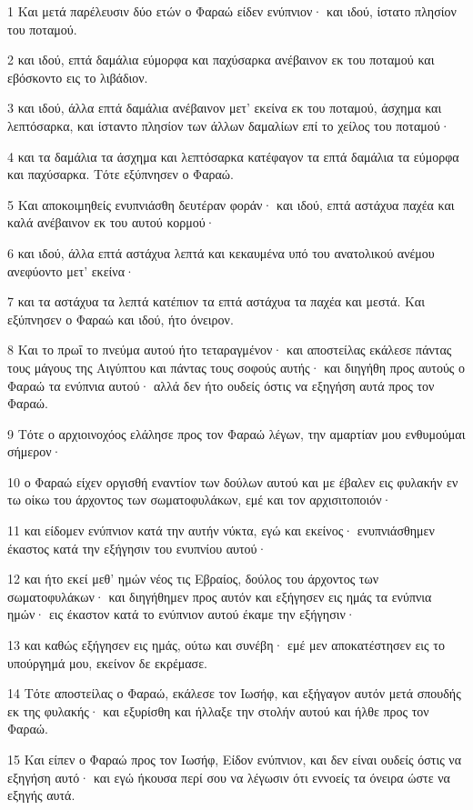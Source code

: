 \par 1 Και μετά παρέλευσιν δύο ετών ο Φαραώ είδεν ενύπνιον· και ιδού, ίστατο πλησίον του ποταμού.
\par 2 και ιδού, επτά δαμάλια εύμορφα και παχύσαρκα ανέβαινον εκ του ποταμού και εβόσκοντο εις το λιβάδιον.
\par 3 και ιδού, άλλα επτά δαμάλια ανέβαινον μετ' εκείνα εκ του ποταμού, άσχημα και λεπτόσαρκα, και ίσταντο πλησίον των άλλων δαμαλίων επί το χείλος του ποταμού·
\par 4 και τα δαμάλια τα άσχημα και λεπτόσαρκα κατέφαγον τα επτά δαμάλια τα εύμορφα και παχύσαρκα. Τότε εξύπνησεν ο Φαραώ.
\par 5 Και αποκοιμηθείς ενυπνιάσθη δευτέραν φοράν· και ιδού, επτά αστάχυα παχέα και καλά ανέβαινον εκ του αυτού κορμού·
\par 6 και ιδού, άλλα επτά αστάχυα λεπτά και κεκαυμένα υπό του ανατολικού ανέμου ανεφύοντο μετ' εκείνα·
\par 7 και τα αστάχυα τα λεπτά κατέπιον τα επτά αστάχυα τα παχέα και μεστά. Και εξύπνησεν ο Φαραώ και ιδού, ήτο όνειρον.
\par 8 Και το πρωΐ το πνεύμα αυτού ήτο τεταραγμένον· και αποστείλας εκάλεσε πάντας τους μάγους της Αιγύπτου και πάντας τους σοφούς αυτής· και διηγήθη προς αυτούς ο Φαραώ τα ενύπνια αυτού· αλλά δεν ήτο ουδείς όστις να εξηγήση αυτά προς τον Φαραώ.
\par 9 Τότε ο αρχιοινοχόος ελάλησε προς τον Φαραώ λέγων, την αμαρτίαν μου ενθυμούμαι σήμερον·
\par 10 ο Φαραώ είχεν οργισθή εναντίον των δούλων αυτού και με έβαλεν εις φυλακήν εν τω οίκω του άρχοντος των σωματοφυλάκων, εμέ και τον αρχισιτοποιόν·
\par 11 και είδομεν ενύπνιον κατά την αυτήν νύκτα, εγώ και εκείνος· ενυπνιάσθημεν έκαστος κατά την εξήγησιν του ενυπνίου αυτού·
\par 12 και ήτο εκεί μεθ' ημών νέος τις Εβραίος, δούλος του άρχοντος των σωματοφυλάκων· και διηγήθημεν προς αυτόν και εξήγησεν εις ημάς τα ενύπνια ημών· εις έκαστον κατά το ενύπνιον αυτού έκαμε την εξήγησιν·
\par 13 και καθώς εξήγησεν εις ημάς, ούτω και συνέβη· εμέ μεν αποκατέστησεν εις το υπούργημά μου, εκείνον δε εκρέμασε.
\par 14 Τότε αποστείλας ο Φαραώ, εκάλεσε τον Ιωσήφ, και εξήγαγον αυτόν μετά σπουδής εκ της φυλακής· και εξυρίσθη και ήλλαξε την στολήν αυτού και ήλθε προς τον Φαραώ.
\par 15 Και είπεν ο Φαραώ προς τον Ιωσήφ, Είδον ενύπνιον, και δεν είναι ουδείς όστις να εξηγήση αυτό· και εγώ ήκουσα περί σου να λέγωσιν ότι εννοείς τα όνειρα ώστε να εξηγής αυτά.

